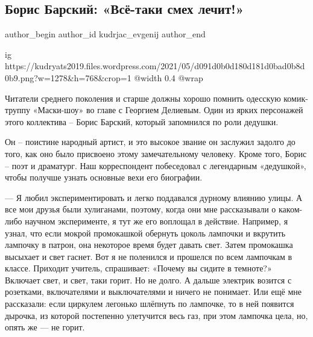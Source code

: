  
 
 
 
 

\subsection{Борис Барский: «Всё-таки смех лечит!»}
\label{sec:12_05_2021.kudrjac_evgenij.1.boris_barskij_smeh_lechit}


\ifcmt
 author_begin
   author_id kudrjac_evgenij
 author_end
\fi

\ifcmt
  ig https://kudryats2019.files.wordpress.com/2021/05/d091d0b0d180d181d0bad0b8d0b9.png?w=1278&h=768&crop=1
  @width 0.4
  @wrap \parpic[r]
\fi

\begingroup
\bfseries

Читатели среднего поколения и старше должны хорошо помнить одесскую
комик-труппу «Маски-шоу» во главе с Георгием Делиевым. Один из ярких персонажей
этого коллектива – Борис Барский, который запомнился по роли дедушки.

Он – поистине народный артист, и это высокое звание он заслужил задолго до
того, как оно было присвоено этому замечательному человеку.  Кроме того, Борис
– поэт и драматург. Наш корреспондент побеседовал с легендарным «дедушкой»,
чтобы получше узнать основные вехи его биографии.
\endgroup


— Я любил экспериментировать и легко поддавался дурному влиянию улицы. А все
мои друзья были хулиганами, поэтому, когда они мне рассказывали о каком-либо
научном эксперименте, я тут же его воплощал в действие. Например, я узнал, что
если мокрой промокашкой обернуть цоколь лампочки и вкрутить лампочку в патрон,
она некоторое время будет давать свет. Затем промокашка высыхает и свет гаснет.
Вот я не поленился и прошелся по всем лампочкам в классе. Приходит учитель,
спрашивает: «Почему вы сидите в темноте?» Включает свет, и свет, таки горит. Но
не долго. А дальше электрик возится с розетками, включателями и выключателями и
ничего не понимает. Или ещё мне рассказали: если циркулем легонько шлёпнуть по
лампочке, то в ней появится дырочка, из которой постепенно улетучится весь газ,
при этом лампочка цела, но, опять же — не горит.

